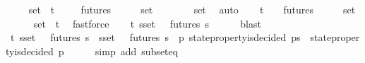 \begin{isabellebody}
\isanewline
\ \ \isamarkupfalse%
\ {\isachardoublequoteopen}{\isasymUnion}\ {\isasymsigma}{\isacharunderscore}set\ {\isasymin}\ {\isasymSigma}t{\isachardoublequoteclose}\isanewline
\ \ \isamarkupfalse%
\ {\isachardoublequoteopen}{\isasymInter}\ {\isacharbraceleft}futures\ {\isasymsigma}\ {\isacharbar}\ {\isasymsigma}{\isachardot}\ {\isasymsigma}\ {\isasymin}\ {\isasymsigma}{\isacharunderscore}set{\isacharbraceright}\ {\isasymnoteq}\ {\isasymemptyset}{\isachardoublequoteclose}\isanewline
\ \ \ \ \isamarkupfalse%
\ {\isasymsigma}{\isacharunderscore}set\ \isamarkupfalse%
\ auto\isanewline
\ \ \isamarkupfalse%
\ {\isachardoublequoteopen}{\isasymexists}{\isasymsigma}{\isasymin}{\isasymSigma}t{\isachardot}\ {\isasymsigma}\ {\isasymin}\ {\isasymInter}\ {\isacharbraceleft}futures\ {\isasymsigma}\ {\isacharbar}\ {\isasymsigma}{\isachardot}\ {\isasymsigma}\ {\isasymin}\ {\isasymsigma}{\isacharunderscore}set{\isacharbraceright}{\isachardoublequoteclose}\isanewline
\ \ \ \ \isamarkupfalse%
\ {\isacartoucheopen}{\isasymUnion}{\isasymsigma}{\isacharunderscore}set\ {\isasymin}\ {\isasymSigma}t{\isacartoucheclose}\ \isamarkupfalse%
\ fastforce\isanewline
\ \ \isamarkupfalse%
\ {\isachardoublequoteopen}{\isasymexists}{\isasymsigma}{\isasymin}{\isasymSigma}t{\isachardot}\ {\isasymforall}s{\isasymin}{\isasymsigma}{\isacharunderscore}set{\isachardot}\ {\isasymsigma}\ {\isasymin}\ futures\ s{\isachardoublequoteclose}\isanewline
\ \ \ \ \isamarkupfalse%
\ blast\isanewline
\ \ \isamarkupfalse%
\ {\isachardoublequoteopen}{\isasymexists}{\isasymsigma}{\isasymin}{\isasymSigma}t{\isachardot}\ {\isacharparenleft}{\isasymforall}s{\isasymin}{\isasymsigma}{\isacharunderscore}set{\isachardot}\ {\isasymsigma}\ {\isasymin}\ futures\ s{\isacharparenright}\ {\isasymand}\ {\isacharparenleft}{\isasymforall}s{\isasymin}{\isasymsigma}{\isacharunderscore}set{\isachardot}\ {\isasymsigma}\ {\isasymin}\ futures\ s\ {\isasymlongrightarrow}\ {\isacharparenleft}{\isasymforall}p{\isachardot}\ state{\isacharunderscore}property{\isacharunderscore}is{\isacharunderscore}decided\ {\isacharparenleft}p{\isacharcomma}s{\isacharparenright}\ {\isasymlongrightarrow}\ state{\isacharunderscore}property{\isacharunderscore}is{\isacharunderscore}decided\ {\isacharparenleft}p{\isacharcomma}{\isasymsigma}{\isacharparenright}{\isacharparenright}{\isacharparenright}{\isachardoublequoteclose}\isanewline
\ \ \ \ \isamarkupfalse%
\ {\isacharparenleft}simp\ add{\isacharcolon}\ subset{\isacharunderscore}eq{\isacharparenright}\isanewline

\end{isabellebody}
